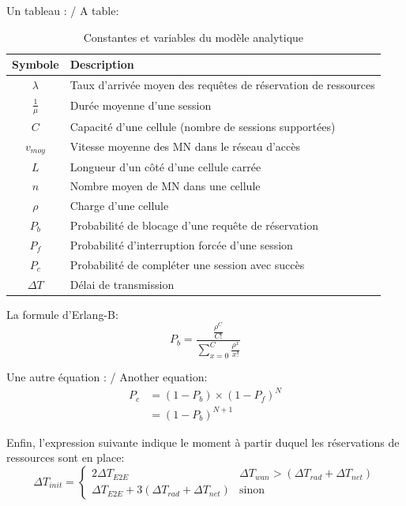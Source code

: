 Un tableau : / A table:
\begin{table}[htb]
  \centering
  \caption{Constantes et variables du modèle analytique}
  \begin{tabular}{|c|l|}
    \hline\rowcolor[gray]{0.8}\color{black}
    Symbole         & Description\\\hline
    $\lambda$       & Taux d'arrivée moyen des requêtes de réservation de ressources\\\hline
    $\frac{1}{\mu}$ & Durée moyenne d'une session\\\hline
    $C$             & Capacité d'une cellule (nombre de sessions supportées)\\\hline
    $v_{moy}$       & Vitesse moyenne des MN dans le réseau d'accès\\\hline
    $L$             & Longueur d'un côté d'une cellule carrée\\\hline
    $n$             & Nombre moyen de MN dans une cellule\\\hline
    $\rho$          & Charge d'une cellule\\\hline
    $P_b$           & Probabilité de blocage d'une requête de réservation\\\hline
    $P_f$           & Probabilité d'interruption forcée d'une session\\\hline
    $P_c$           & Probabilité de compléter une session avec succès\\\hline
    $\Delta{}T$     & Délai de transmission\\\hline
  \end{tabular}
  \label{tab:Definitions}
\end{table}

La formule d'\mbox{Erlang-B}:
\begin{equation}
  P_b = \frac{\frac{\rho^C}{C!}}{\sum\limits_{x=0}^{C}\frac{\rho^x}{x!}}
  \label{eq:Pblock}
\end{equation}

Une autre équation : / Another equation:
\begin{equation}
  \begin{split}
    P_c &= (1 - P_b) \times (1 -  P_f)^N\\
        &= (1 - P_b)^{N+1}
  \end{split}
  \label{eq:ProbComplete}
\end{equation}

Enfin, l'expression suivante indique le moment à partir duquel les
réservations de ressources sont en place:
\begin{equation}
  \Delta{}T_{init} =
  \begin{cases}
    2\Delta{}T_{E2E} & \Delta{}T_{wan} > (\Delta{}T_{rad} + \Delta{}T_{net})\\
    \Delta{}T_{E2E} + 3(\Delta{}T_{rad} + \Delta{}T_{net}) & \text{sinon}
  \end{cases}
  \label{eq:InitCost}
\end{equation}

